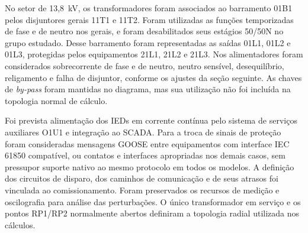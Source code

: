 No setor de 13,8~kV, os transformadores foram associados ao barramento 01B1 pelos disjuntores gerais 11T1 e 11T2. Foram utilizadas as funções temporizadas de fase e de neutro nos gerais, e foram desabilitados seus estágios 50/50N no grupo estudado. Desse barramento foram representadas as saídas 01L1, 01L2 e 01L3, protegidas pelos equipamentos 21L1, 21L2 e 21L3. Nos alimentadores foram considerados sobrecorrente de fase e de neutro, neutro sensível, desequilíbrio, religamento e falha de disjuntor, conforme os ajustes da seção seguinte. As chaves de \textit{by-pass} foram mantidas no diagrama, mas sua utilização não foi incluída na topologia normal de cálculo.

Foi prevista alimentação dos IEDs em corrente contínua pelo sistema de serviços auxiliares O1U1 e integração ao SCADA. Para a troca de sinais de proteção foram consideradas mensagens GOOSE entre equipamentos com interface IEC 61850 compatível, ou contatos e interfaces apropriadas nos demais casos, sem pressupor suporte nativo ao mesmo protocolo em todos os modelos. A definição dos circuitos de disparo, dos caminhos de comunicação e de seus atrasos foi vinculada ao comissionamento. Foram preservados os recursos de medição e oscilografia para análise das perturbações. O único transformador em serviço e os pontos RP1/RP2 normalmente abertos definiram a topologia radial utilizada nos cálculos.
